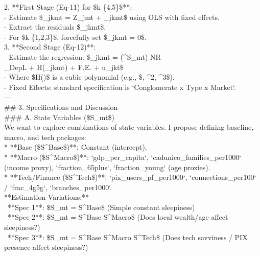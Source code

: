 \documentclass{article}
\begin{document}
2. **First Stage (Eq-11) for \$k \in \{4,5\}\$**: \\
   - Estimate \$\rho\_{jkmt} = \lambda Z\_{jmt} + \nu\_{jkmt}\$ using OLS with fixed effects. \\
   - Extract the residuals \$\hat{\nu}\_{jkmt}\$. \\
   - For \$k \in \{1,2,3\}\$, forcefully set \$\hat{\nu}\_{jkmt} = 0\$. \\



3. **Second Stage (Eq-12)**: \\
   - Estimate the regression: \$\_{jkmt} = (\boldsymbol{\Upsilon}^\prime S\_{mt}) \times NR\\_DepL + H(\hat{\nu}\_{jkmt}) + F.E. + u\_{jkt}\$ \\
   - Where \$H(\cdot)\$ is a cubic polynomial (e.g., \$\hat{\nu}, \hat{\nu}^2, \hat{\nu}^3\$). \\
   - Fixed Effects: standard specification is `Conglomerate x Type x Market`. \\



--- \\



\#\# 3. Specifications and Discussion \\



\#\#\# A. State Variables (\$S\_{mt}\$) \\



We want to explore combinations of state variables. I propose defining baseline, macro, and tech packages: \\
*   **Base (\$S^{Base}\$)**: Constant (intercept). \\
*   **Macro (\$S^{Macro}\$)**: `gdp\_per\_capita`, `cadunico\_families\_per1000` (income proxy), `fraction\_65plus`, `fraction\_young` (age proxies). \\
*   **Tech/Finance (\$S^{Tech}\$)**: `pix\_users\_pf\_per1000`, `connections\_per100` / `frac\_4g5g`, `branches\_per1000`. \\



**Estimation Variations:** \\
\textbullet\ **Spec 1**: \$S\_{mt} = S^{Base}\$ (Simple constant sleepiness) \\
\textbullet\ **Spec 2**: \$S\_{mt} = S^{Base} \cup S^{Macro}\$ (Does local wealth/age affect sleepiness?) \\
\textbullet\ **Spec 3**: \$S\_{mt} = S^{Base} \cup S^{Macro} \cup S^{Tech}\$ (Does tech savviness / PIX presence affect sleepiness?) \\
\end{document}
